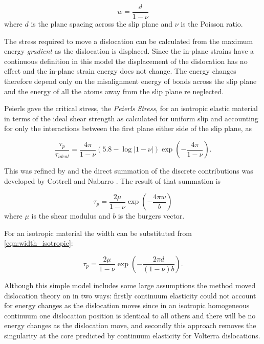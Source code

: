 \begin{equation}
w = \frac{d}{1-\nu}
\label{eqn:width_isotropic}
\end{equation}
where $d$ is the plane spacing across the slip plane and $\nu$ is the Poisson ratio.

The stress required to move a dislocation can be calculated from the maximum energy \emph{gradient} as the dislocation is displaced. Since the in-plane strains have a continuous definition in this model the displacement of the dislocation has no effect and the in-plane strain energy does not change. The energy changes therefore depend only on the misalignment energy of bonds across the slip plane and the energy of all the atoms away from the slip plane re neglected.

Peierls gave the critical stress, the \emph{Peierls Stress}, for an isotropic elastic material in terms of the ideal shear strength as calculated for uniform slip and accounting for only the interactions between the first plane either side of the slip plane, as


\begin{equation}
\frac{\tau_p}{\tau_{ideal}} = \frac{4 \pi}{1 - \nu} (5.8 - \log|1-\nu|) \exp\left(-\frac{4\pi}{1 - \nu}\right).
\end{equation}

This was refined by \citet{Nabarro1947} and the direct summation of the discrete contributions was developed by Cottrell and Nabarro \cite{Cottrell1953}. The result of that summation is



\begin{equation}
\tau_p = \frac{2\mu}{1-\nu} \exp\left( - \frac{4\pi w}{b} \right)
\end{equation}
where $\mu$ is the shear modulus and $b$ is the burgers vector.

For an isotropic material the width can be substituted from \autoref{eqn:width_isotropic}:

\begin{equation}
\tau_p = \frac{2\mu}{1-\nu} \exp\left( - \frac{2\pi d}{(1-\nu)b} \right).
\end{equation}

Although this simple model includes some large assumptions the method moved dislocation theory on in two ways: firstly continuum elasticity could not account for energy changes as the dislocation moves since in an isotropic homogeneous continuum one dislocation position is identical to all others and there will be no energy changes as the dislocation move, and secondly this approach removes the singularity at the core predicted by continuum elasticity for Volterra dislocations.


